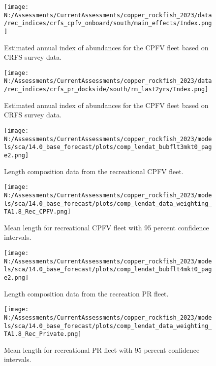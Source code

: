 \documentclass[11pt,
  english,
  letterpaper,
]{article}
\begin{document}
\pagebreak

\begin{figure}
\centering
\texttt{[image: N:/Assessments/CurrentAssessments/copper\_rockfish\_2023/data/rec\_indices/crfs\_cpfv\_onboard/south/main\_effects/Index.png]}
\caption{Estimated annual index of abundances for the CPFV fleet based on CRFS survey data.\label{fig:crfs-index-main}}
\end{figure}

\pagebreak

\begin{figure}
\centering
\texttt{[image: N:/Assessments/CurrentAssessments/copper\_rockfish\_2023/data/rec\_indices/crfs\_pr\_dockside/south/rm\_last2yrs/Index.png]}
\caption{Estimated annual index of abundances for the CPFV fleet based on CRFS survey data.\label{fig:crfs-pr-index-main}}
\end{figure}

\pagebreak

\begin{figure}
\centering
\texttt{[image: N:/Assessments/CurrentAssessments/copper\_rockfish\_2023/models/sca/14.0\_base\_forecast/plots/comp\_lendat\_bubflt3mkt0\_page2.png]}
\caption{Length composition data from the recreational CPFV fleet.\label{fig:rec-cpfv-len-data}}
\end{figure}

\pagebreak

\begin{figure}
\centering
\texttt{[image: N:/Assessments/CurrentAssessments/copper\_rockfish\_2023/models/sca/14.0\_base\_forecast/plots/comp\_lendat\_data\_weighting\_TA1.8\_Rec\_CPFV.png]}
\caption{Mean length for recreational CPFV fleet with 95 percent confidence intervals.\label{fig:mean-rec-cpfv-len-data}}
\end{figure}

\pagebreak

\begin{figure}
\centering
\texttt{[image: N:/Assessments/CurrentAssessments/copper\_rockfish\_2023/models/sca/14.0\_base\_forecast/plots/comp\_lendat\_bubflt4mkt0\_page2.png]}
\caption{Length composition data from the recreation PR fleet.\label{fig:rec-pr-len-data}}
\end{figure}

\pagebreak

\begin{figure}
\centering
\texttt{[image: N:/Assessments/CurrentAssessments/copper\_rockfish\_2023/models/sca/14.0\_base\_forecast/plots/comp\_lendat\_data\_weighting\_TA1.8\_Rec\_Private.png]}
\caption{Mean length for recreational PR fleet with 95 percent confidence intervals.\label{fig:mean-rec-pr-len-data}}
\end{figure}
\end{document}
